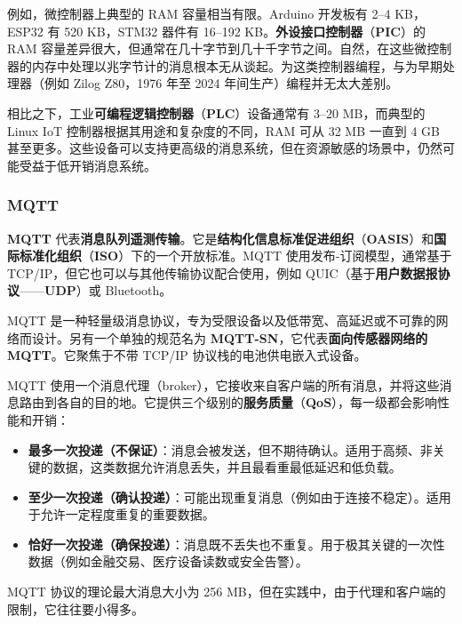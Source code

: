 \label{idx:1505}
\label{idx:1506}
\label{idx:1507}
例如，微控制器上典型的 RAM 容量相当有限。Arduino 开发板有 2–4 KB，ESP32 有 520 KB，STM32 器件有 16–192 KB。\textbf{外设接口控制器}（\textbf{PIC}）的 RAM 容量差异很大，但通常在几十字节到几十千字节之间。自然，在这些微控制器的内存中处理以兆字节计的消息根本无从谈起。为这类控制器编程，与为早期处理器（例如 Zilog Z80，1976 年至 2024 年间生产）编程并无太大差别。

\label{idx:1508}
相比之下，工业\textbf{可编程逻辑控制器}（\textbf{PLC}）设备通常有 3–20 MB，而典型的 Linux IoT 控制器根据其用途和复杂度的不同，RAM 可从 32 MB 一直到 4 GB 甚至更多。这些设备可以支持更高级的消息系统，但在资源敏感的场景中，仍然可能受益于低开销消息系统。

\subsubsection{MQTT}

\label{idx:1509}
\textbf{MQTT} 代表\textbf{消息队列遥测传输}。它是\textbf{结构化信息标准促进组织}（\textbf{OASIS}）和\textbf{国际标准化组织}（\textbf{ISO}）下的一个开放标准。MQTT 使用发布-订阅模型，通常基于 TCP/IP，但它也可以与其他传输协议配合使用，例如 QUIC（基于\textbf{用户数据报协议}——\textbf{UDP}）或 Bluetooth。


\label{idx:1510}
MQTT 是一种轻量级消息协议，专为受限设备以及低带宽、高延迟或不可靠的网络而设计。另有一个单独的规范名为 \textbf{MQTT-SN}，它代表\textbf{面向传感器网络的 MQTT}。它聚焦于不带 TCP/IP 协议栈的电池供电嵌入式设备。

\label{idx:1511}
MQTT 使用一个消息代理（broker），它接收来自客户端的所有消息，并将这些消息路由到各自的目的地。它提供三个级别的\textbf{服务质量}（\textbf{QoS}），每一级都会影响性能和开销：

\begin{itemize}
\item \textbf{最多一次投递（不保证）}：消息会被发送，但不期待确认。适用于高频、非关键的数据，这类数据允许消息丢失，并且最看重最低延迟和低负载。
\item \textbf{至少一次投递（确认投递）}：可能出现重复消息（例如由于连接不稳定）。适用于允许一定程度重复的重要数据。
\item \textbf{恰好一次投递（确保投递）}：消息既不丢失也不重复。用于极其关键的一次性数据（例如金融交易、医疗设备读数或安全告警）。
\end{itemize}

MQTT 协议的理论最大消息大小为 256 MB，但在实践中，由于代理和客户端的限制，它往往要小得多。


